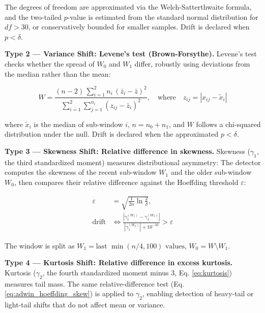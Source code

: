 The degrees of freedom are approximated via the Welch-Satterthwaite formula, and the two-tailed $p$-value is estimated from the standard normal distribution for $df > 30$, or conservatively bounded for smaller samples. Drift is declared when $p < \delta$.

\bigskip
\noindent\textbf{Type 2 --- Variance Shift: Levene's test (Brown-Forsythe).} Levene's test checks whether the spread of $W_0$ and $W_1$ differ, robustly using deviations from the median rather than the mean:

\begin{equation}
W = \frac{(n - 2)\,\sum_{i=1}^{2} n_i\,(\bar{z}_{i} - \bar{z})^2}{\sum_{i=1}^{2}\sum_{j=1}^{n_i}(z_{ij} - \bar{z}_i)^2},
\quad\text{where}\quad z_{ij} = |x_{ij} - \tilde{x}_i|
\label{eq:levene_test}
\end{equation}

where $\tilde{x}_i$ is the median of sub-window $i$, $n = n_0 + n_1$, and $W$ follows a chi-squared distribution under the null. Drift is declared when the approximated $p < \delta$.

\bigskip
\noindent\textbf{Type 3 --- Skewness Shift: Relative difference in skewness.} Skewness ($\gamma_1$, the third standardized moment) measures distributional asymmetry: The detector computes the skewness of the recent sub-window $W_1$ and the older sub-window $W_0$, then compares their relative difference against the Hoeffding threshold $\varepsilon$:

\begin{equation}
\begin{aligned}
\varepsilon &= \sqrt{\frac{1}{2n}\ln\frac{2}{\delta}}, \\[4pt]
\text{drift} &\iff \frac{|\gamma_1^{(W_1)} - \gamma_1^{(W_0)}|}{|\gamma_1^{(W_0)}| + 10^{-10}} > \varepsilon
\end{aligned}
\label{eq:adwin_hoeffding_skew}
\end{equation}

The window is split as $W_1 = \text{last }\min(n/4, 100)\text{ values}$, $W_0 = W \setminus W_1$.

\bigskip
\noindent\textbf{Type 4 --- Kurtosis Shift: Relative difference in excess kurtosis.} Kurtosis ($\gamma_2$, the fourth standardized moment minus 3, Eq. \ref{eq:kurtosis}) measures tail mass. The same relative-difference test (Eq. \ref{eq:adwin_hoeffding_skew}) is applied to $\gamma_2$, enabling detection of heavy-tail or light-tail shifts that do not affect mean or variance.

